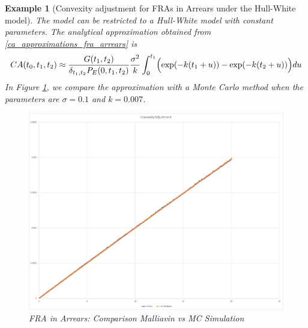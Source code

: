 \documentclass[a4paper,10pt]{article}
\newtheorem{example}[theorem]{Example}
\newcommand{\1}{\mathbf{1}}
\begin{document}
\begin{example}[Convexity adjustment for FRAs in Arrears under the Hull-White model]\label{example_convexity_hw_FRAsinArrears}
The model can be restricted to a Hull-White model with constant parameters. The analytical approximation obtained from \eqref{ca_approximations_fra_arrears} is
\begin{equation*}
CA(t_0,t_1,t_2) \approx \frac{G(t_1,t_2)}{\delta_{t_1,t_2}P_{E}(0,t_1,t_2)}  \frac{\sigma^{2}}{k} \int_{0}^{t_1} \Bigl(\exp(- k(t_1 + u)) -   \exp(- k(t_2 + u))\Bigr) du 
\end{equation*}
In Figure \ref{fig:FRA_HW}, we compare the approximation with a Monte Carlo method when the parameters are $\sigma=0.1$ and $k=0.007$.
\begin{figure}[H]
		\begin{center}
		\includegraphics[scale=0.3]{Figures/fra_convexity.jpg}
		\end{center}
		\caption{FRA in Arrears: Comparison Malliavin vs MC Simulation}
		\label{fig:FRA_HW}
\end{figure}
\end{example}
\end{document}
